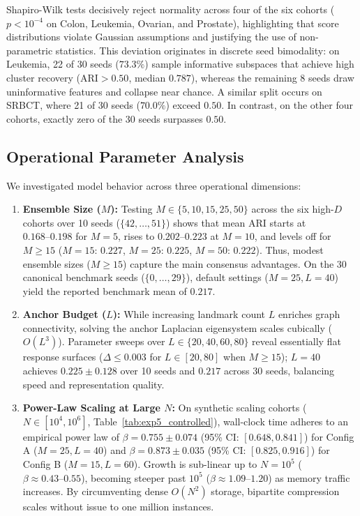 \documentclass[pdflatex,sn-mathphys-num]{sn-jnl}
\theoremstyle{thmstyleone}
\theoremstyle{thmstyletwo}
\theoremstyle{thmstylethree}
\begin{document}


Shapiro-Wilk tests decisively reject normality across four of the six cohorts ($p < 10^{-4}$ on Colon, Leukemia, Ovarian, and Prostate), highlighting that score distributions violate Gaussian assumptions and justifying the use of non-parametric statistics. This deviation originates in discrete seed bimodality: on Leukemia, 22 of 30 seeds ($73.3\%$) sample informative subspaces that achieve high cluster recovery ($\text{ARI} > 0.50$, median $0.787$), whereas the remaining 8 seeds draw uninformative features and collapse near chance. A similar split occurs on SRBCT, where 21 of 30 seeds ($70.0\%$) exceed $0.50$. In contrast, on the other four cohorts, exactly zero of the 30 seeds surpasses $0.50$.

\clearpage
\subsection{Operational Parameter Analysis}\label{sec:param_scaling}
We investigated model behavior across three operational dimensions:
\begin{enumerate}
 \item \textbf{Ensemble Size ($M$):} Testing $M \in \{5, 10, 15, 25, 50\}$ across the six high-$D$ cohorts over 10 seeds ($\{42, \dots, 51\}$) shows that mean ARI starts at $0.168\text{--}0.198$ for $M=5$, rises to $0.202\text{--}0.223$ at $M=10$, and levels off for $M \ge 15$ ($M=15$: $0.227$, $M=25$: $0.225$, $M=50$: $0.222$). Thus, modest ensemble sizes ($M \ge 15$) capture the main consensus advantages. On the 30 canonical benchmark seeds ($\{0, \dots, 29\}$), default settings ($M=25, L=40$) yield the reported benchmark mean of $0.217$.
 \item \textbf{Anchor Budget ($L$):} While increasing landmark count $L$ enriches graph connectivity, solving the anchor Laplacian eigensystem scales cubically ($O(L^3)$). Parameter sweeps over $L \in \{20, 40, 60, 80\}$ reveal essentially flat response surfaces ($\Delta \le 0.003$ for $L \in [20, 80]$ when $M \ge 15$); $L=40$ achieves $0.225 \pm 0.128$ over 10 seeds and $0.217$ across 30 seeds, balancing speed and representation quality.
 \item \textbf{Power-Law Scaling at Large $N$:} On synthetic scaling cohorts ($N \in [10^4, 10^6]$, Table~\ref{tab:exp5_controlled}), wall-clock time adheres to an empirical power law of $\beta = 0.755 \pm 0.074$ (95\% CI: $[0.648, 0.841]$) for Config A ($M=25, L=40$) and $\beta = 0.873 \pm 0.035$ (95\% CI: $[0.825, 0.916]$) for Config B ($M=15, L=60$). Growth is sub-linear up to $N=10^5$ ($\beta \approx 0.43\text{--}0.55$), becoming steeper past $10^5$ ($\beta \approx 1.09\text{--}1.20$) as memory traffic increases. By circumventing dense $O(N^2)$ storage, bipartite compression scales without issue to one million instances.
\end{enumerate}
\end{document}
